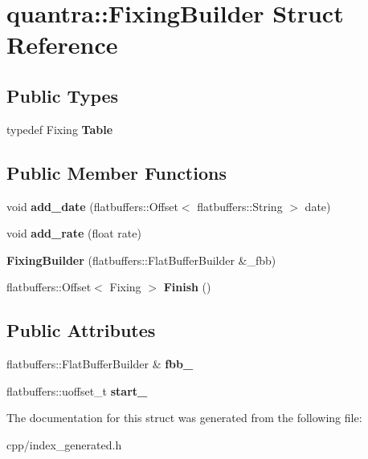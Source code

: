 \hypertarget{structquantra_1_1FixingBuilder}{}\section{quantra\+:\+:Fixing\+Builder Struct Reference}
\label{structquantra_1_1FixingBuilder}
\subsection*{Public Types}
\begin{DoxyCompactItemize}
\item 
\mbox{\label{structquantra_1_1FixingBuilder_ae38050f27c9631e909a88bef6f027005}} 
typedef Fixing {\bfseries Table}
\end{DoxyCompactItemize}
\subsection*{Public Member Functions}
\begin{DoxyCompactItemize}
\item 
\mbox{\label{structquantra_1_1FixingBuilder_a180cdb156de06d46198b084725ffeedd}} 
void {\bfseries add\+\_\+date} (flatbuffers\+::\+Offset$<$ flatbuffers\+::\+String $>$ date)
\item 
\mbox{\label{structquantra_1_1FixingBuilder_a81f076bd9ea6d0a780b2c1254b83fd01}} 
void {\bfseries add\+\_\+rate} (float rate)
\item 
\mbox{\label{structquantra_1_1FixingBuilder_aebbacc746afc4ec6631cd241bfb5dffd}} 
{\bfseries Fixing\+Builder} (flatbuffers\+::\+Flat\+Buffer\+Builder \&\+\_\+fbb)
\item 
\mbox{\label{structquantra_1_1FixingBuilder_a04e4c8466fff9724edfff0f648c3f750}} 
flatbuffers\+::\+Offset$<$ Fixing $>$ {\bfseries Finish} ()
\end{DoxyCompactItemize}
\subsection*{Public Attributes}
\begin{DoxyCompactItemize}
\item 
\mbox{\label{structquantra_1_1FixingBuilder_aca2ea8585cb3946bbc806cf994586c8c}} 
flatbuffers\+::\+Flat\+Buffer\+Builder \& {\bfseries fbb\+\_\+}
\item 
\mbox{\label{structquantra_1_1FixingBuilder_af671cf34ee3ee8aeae95ba610a82f55c}} 
flatbuffers\+::uoffset\+\_\+t {\bfseries start\+\_\+}
\end{DoxyCompactItemize}


The documentation for this struct was generated from the following file\+:\begin{DoxyCompactItemize}
\item 
cpp/index\+\_\+generated.\+h\end{DoxyCompactItemize}
